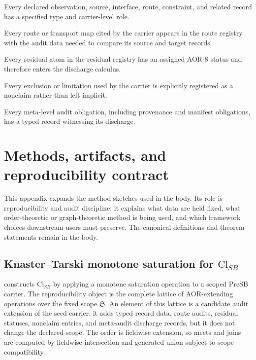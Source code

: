 \documentclass[11pt]{article}
\newcommand{\ClSB}{\mathrm{Cl}_{SB}}
\theoremstyle{definition}
\begin{document}
\begin{description}[style=nextline]
\item[\texttt{declaredRecordsTyped}.]
Every declared observation, source, interface, route, constraint, and
related record has a specified type and carrier-level role.

\item[\texttt{citedRoutesAudited}.]
Every route or transport map cited by the carrier appears in the route
registry with the audit data needed to compare its source and target
records.

\item[\texttt{residualsStatused}.]
Every residual atom in the residual registry has an assigned AOR-8
status and therefore enters the discharge calculus.

\item[\texttt{nonclaimsRegistered}.]
Every exclusion or limitation used by the carrier is explicitly
registered as a nonclaim rather than left implicit.

\item[\texttt{metaAuditDischarged}.]
Every meta-level audit obligation, including provenance and manifest
obligations, has a typed record witnessing its discharge.
\end{description}
 \section{Methods, artifacts, and reproducibility contract}\label{app:methods}

This appendix expands the method sketches used in the body.  Its role
is reproducibility and audit discipline: it explains what data are held
fixed, what order-theoretic or graph-theoretic method is being used, and
which framework choices downstream users must preserve.  The canonical
definitions and theorem statements remain in the body.

\subsection{\texorpdfstring{Knaster--Tarski monotone saturation for
\(\ClSB\)}{Knaster--Tarski monotone saturation for ClSB}}
\label{subsec:aor-methods-clsb-saturation}

 constructs \(\ClSB\) by applying a monotone
saturation operation to a scoped PreSB carrier.  The reproducibility
object is the complete lattice of AOR-extending operations over the
fixed scope \(\mathfrak S\).  An element of this lattice is a candidate
audit extension of the seed carrier: it adds typed record data, route
audits, residual statuses, nonclaim entries, and meta-audit discharge
records, but it does not change the declared scope.  The order is
fieldwise extension, so meets and joins are computed by fieldwise
intersection and generated union subject to scope compatibility.
\end{document}
